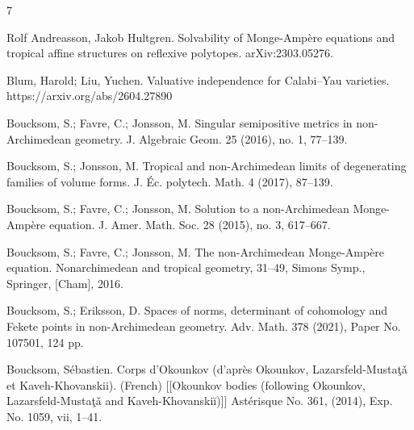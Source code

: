 \documentclass[a4paper]{article}
\theoremstyle{definition}
\begin{document}
	\begin{thebibliography}{7}
		
		
		
		
		
		


			
			
			
			
			
			
			Rolf Andreasson, Jakob Hultgren.
			Solvability of Monge-Amp\`ere equations and tropical affine structures on reflexive polytopes.  	arXiv:2303.05276.
			
			
			
			
			  Blum, Harold; Liu, Yuchen. Valuative independence for Calabi--Yau varieties. https://arxiv.org/abs/2604.27890
			
			
			
			
			Boucksom, S.; Favre, C.; Jonsson, M. Singular semipositive metrics in non-Archimedean geometry. J. Algebraic Geom. 25 (2016), no. 1, 77--139. 
			
			
			Boucksom, S.; Jonsson, M. Tropical and non-Archimedean limits of degenerating families of volume forms. J. Éc. polytech. Math. 4 (2017), 87--139. 
			
			
			
			
			
			
			
			Boucksom, S.; Favre, C.; Jonsson, M. Solution to a non-Archimedean Monge-Ampère equation. J. Amer. Math. Soc. 28 (2015), no. 3, 617--667.
			
			
			Boucksom, S.; Favre, C.; Jonsson, M. The non-Archimedean Monge-Ampère equation. Nonarchimedean and tropical geometry, 31--49, Simons Symp., Springer, [Cham], 2016. 
			
			
			
			
			  Boucksom, S.; Eriksson, D. Spaces of norms, determinant of cohomology and Fekete points in non-Archimedean geometry. 	
			Adv. Math. 378 (2021), Paper No. 107501, 124 pp. 
			
			
			
			  Boucksom, Sébastien. Corps d'Okounkov (d'après Okounkov, Lazarsfeld-Mustaţǎ et Kaveh-Khovanskii). (French) [[Okounkov bodies (following Okounkov, Lazarsfeld-Mustaţǎ and Kaveh-Khovanskiĭ)]] Astérisque No. 361, (2014), Exp. No. 1059, vii, 1--41.
			

\end{thebibliography}
\end{document}
